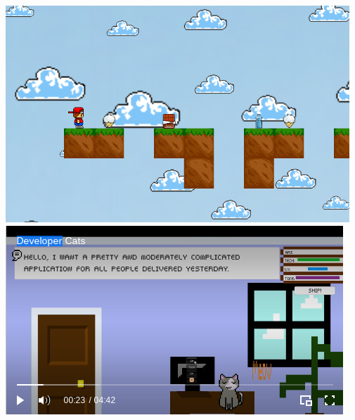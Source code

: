 \documentclass[../resume.tex]{subfiles}
\begin{document}
\noindent
\href{https://github.com/randompast/Vitaman-Game}{\includegraphics[scale=0.37]{../fun/vitamangame.png}}
\href{../fun/devcats.mp4}{\includegraphics[scale=0.425]{../fun/devcats.png}}
\end{document}

